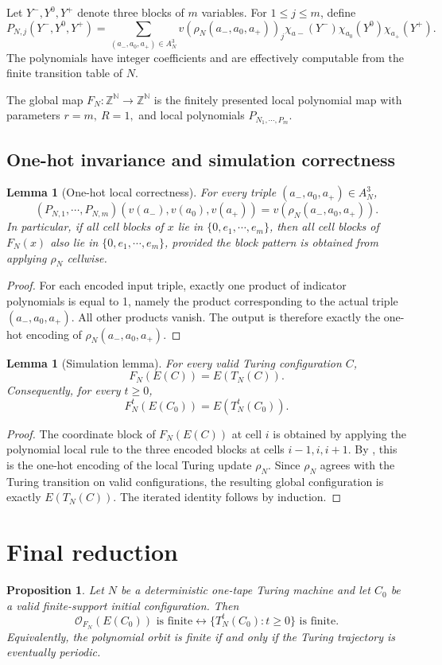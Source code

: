 \documentclass{amsart}
\newtheorem{lemma}[theorem]{Lemma}
\newtheorem{proposition}[theorem]{Proposition}
\theoremstyle{definition}
\theoremstyle{remark}
\numberwithin{equation}{section}
\newcommand{\Z}{\mathbb{Z}}
\newcommand{\N}{\mathbb{N}}
\begin{document}
Let $Y^-,Y^0,Y^+$ denote three blocks of $m$ variables.
For $1\le j\le m$, define
\[P_{N,j}(Y^-,Y^0,Y^+)=\sum_{(a_-,a_0,a_+)\in A^3_N}v(\rho_N(a_-,a_0,a_+))_j\chi_{a-}(Y^-)\chi_{a_0}(Y^0)\chi_{a_+}(Y^+).\]
The polynomials have integer coefficients and are effectively computable from the finite transition table of $N$.

The global map $F_N:\Z^\N\to\Z^\N$ is the finitely presented local polynomial map with parameters $r=m,\ R=1,$ and local polynomials $P_{N_1,\cdots,P_m}$.

\subsection{One-hot invariance and simulation correctness}
\begin{lemma}[One-hot local correctness]\label{lem_oisc}
For every triple $(a_-,a_0,a_+)\in A^3_N$,
\[(P_{N,1},\cdots,P_{N,m})(v(a_-),v(a_0),v(a_+))=v(\rho_N(a_-,a_0,a_+)).\]
In particular, if all cell blocks of $x$ lie in $\{0,e_1,\cdots,e_m\}$, then all cell blocks of $F_N(x)$ also lie in $\{0,e_1,\cdots,e_m\}$, provided the block pattern is obtained from applying $\rho_N$ cellwise.
\end{lemma}

\begin{proof}
For each encoded input triple, exactly one product of indicator polynomials is equal to 1, namely the product corresponding to the actual triple $(a_-,a_0,a_+)$.
All other products vanish.
The output is therefore exactly the one-hot encoding of $\rho_N(a_-,a_0,a_+)$.
\end{proof}

\begin{lemma}[Simulation lemma]\label{lem_sim}
For every valid Turing configuration $C$,
\[F_N(E(C))=E(T_N(C)).\]
Consequently, for every $t\ge0$,
\[F^t_N(E(C_0))=E(T^t_N(C_0)).\]
\end{lemma}

\begin{proof}
The coordinate block of $F_N(E(C))$ at cell $i$ is obtained by applying the polynomial local rule to the three encoded blocks at cells $i-1,i,i+1$.
By , this is the one-hot encoding of the local Turing update $\rho_N$.
Since $\rho_N$ agrees with the Turing transition on valid configurations, the resulting global configuration is exactly $E(T_N(C))$.
The iterated identity follows by induction.
\end{proof}

\section{Final reduction}
\begin{proposition}\label{prop_ofrt}
Let $N$ be a deterministic one-tape Turing machine and let $C_0$ be a valid finite-support initial configuration.
Then
\[\mathcal{O}_{F_N}(E(C_0))\text{ is finite}\longleftrightarrow\{T^t_N(C_0):t\ge0\}\text{ is finite.}\]
Equivalently, the polynomial orbit is finite if and only if the Turing trajectory is eventually periodic.
\end{proposition}
\end{document}
